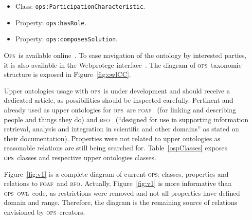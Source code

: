 \documentclass[10pt,letterpaper]{article}
\newcommand{\ops}{\textsc{ops}}
\newcommand{\opsi}{O\textsc{ps}}
\newcommand{\owl}{\textsc{owl}}
\newcommand{\bfo}{\textsc{bfo}}
\newcommand{\foaf}{\textsc{foaf}}
\begin{document}
\begin{itemize}
    \item Class: {\tt    ops:ParticipationCharacteristic}.
    \item Property: {\tt ops:hasRole}.
    \item Property: {\tt ops:composesSolution}.
\end{itemize}

\opsi\ is available online~\cite{owlOSP}. To ease navigation of the ontology by interested parties, it is also available in the Webprotege interface~\cite{owlOSPwp}. The diagram of \ops\ taxonomic structure is exposed in Figure~\ref{fig:owlCC}.

Upper ontologies usage with \ops\ is under development and should receive a dedicated article, as possibilities should be inspected carefully. Pertinent and already used as upper ontologies for \ops\ are \foaf~\cite{foaf} (for linking and describing people and things they do) and \bfo~\cite{bfo} (``designed for use in supporting information retrieval, analysis and integration in scientific and other domains'' as stated on their documentation). Properties were not related to upper ontologies as reasonable relations are still being searched for. Table~\ref{ospClasses} exposes \ops\ classes and respective upper ontologies classes.

Figure~\ref{fig:v1} is a complete diagram of current \ops: classes, properties and relations to \foaf\ and \bfo. Actually, Figure~\ref{fig:v1} is more informative than \ops\ \owl\ code, as restrictions were removed and not all properties have defined domain and range. Therefore, the diagram is the remaining source of relations envisioned by \ops\ creators.
\end{document}
